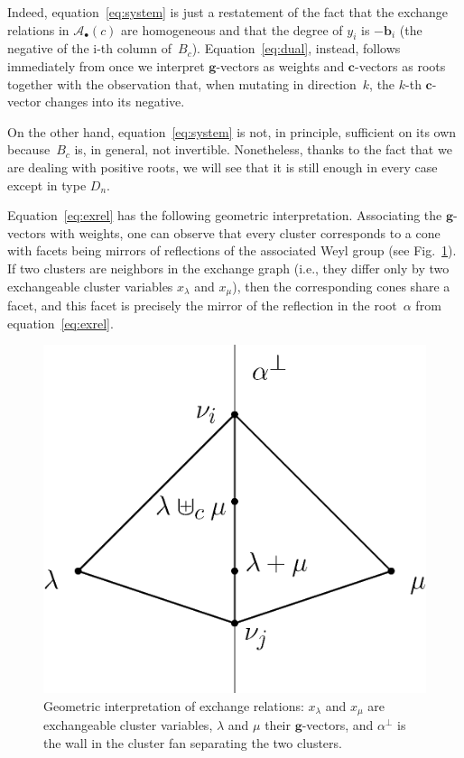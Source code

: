 \documentclass[pdftex]{sigma}
\numberwithin{equation}{section}
\newcommand{\cA}{\mathcal{A}}
\newcommand{\bg}{\mathbf{g}}
\newcommand{\bc}{\mathbf{c}}
\newcommand{\bb}{\mathbf{b}}
\begin{document}
  Indeed, equation~\eqref{eq:system} is just a restatement of the fact that the exchange relations in $\cA_\bullet(c)$ are homogeneous and that the degree of $y_i$ is $-\bb_i$ (the negative of the i-th column of~$B_c$).
  Equation~\eqref{eq:dual}, instead, follows immediately from \cite[equation~(1.11)]{NZ12} once we interpret $\bg$-vectors as weights and $\bc$-vectors as roots together with the observation that, when mutating in direction~$k$, the $k$-th $\bc$-vector changes into its negative.

  On the other hand, equation~\eqref{eq:system} is not, in principle, suf\/f\/icient on its own because~$B_c$ is, in general, not invertible.
  Nonetheless, thanks to the fact that we are dealing with positive roots, we will see that it is still enough in every case except in type $D_n$.

  \begin{Remark} \label{geom}
    Equation~\eqref{eq:exrel} has the following geometric interpretation.
    Associating the $\bg$-vectors with weights, one can observe that every cluster corresponds to a cone with facets being mirrors of ref\/lections of the associated Weyl group (see Fig.~\ref{fig:exchange_relation}).
    If two clusters are neighbors in the exchange graph (i.e., they dif\/fer only by two exchangeable cluster variables $x_\lambda$ and $x_\mu$), then the corresponding cones share a facet, and this facet is precisely the mirror of the ref\/lection in the root~$\alpha$ from equation~\eqref{eq:exrel}.
    \begin{figure}[t] \centering
      \includegraphics[scale=0.4]{cones-section.eps}
      \caption{Geometric interpretation of exchange relations: $x_\lambda$ and $x_\mu$ are exchangeable cluster variables, $\lambda$ and $\mu$ their $\bg$-vectors, and $\alpha^\perp$ is the wall in the cluster fan separating the two clusters.} \label{fig:exchange_relation}
    \end{figure}
  \end{Remark}
\end{document}
